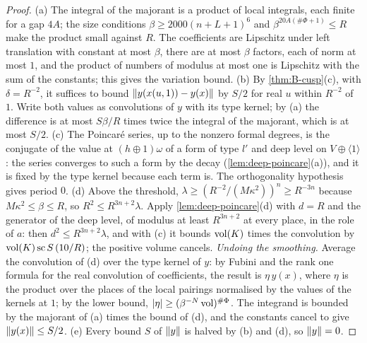 \begin{proof}
(a) The integral of the majorant is a product of local integrals, each finite for a gap $4A$; the size conditions $\beta\ge2000(n+L+1)^6$ and $\beta^{20A(\#\Phi+1)}\le R$ make the product small against $R$. The coefficients are
Lipschitz under left translation with constant at most $\beta$, there are at most $\beta$ factors, each of norm at most $1$, and the product of numbers of modulus at most one is Lipschitz with the sum of the constants;
this gives the variation bound. (b) By \cref{thm:B-cusp}(c), with $\delta=R^{-2}$, it suffices to bound $\lVert y(x(u,1))-y(x)\rVert$ by $S/2$ for real $u$ within $R^{-2}$ of $1$. Write both values as convolutions of $y$ with its type
kernel; by (a) the difference is at most $S\beta/R$ times twice the integral of the majorant, which is at most $S/2$. (c) The Poincar\'e series, up to the nonzero formal degrees, is the conjugate of the value at
$(h\oplus1)\omega$ of a form of type $l'$ and deep level on $V\oplus\langle1\rangle$: the series converges to such a form by the decay (\cref{lem:deep-poincare}(a)), and it is fixed by the type kernel because each term is.
The orthogonality hypothesis gives period $0$. (d) Above the threshold, $\lambda\ge(R^{-2}/(M\kappa^2))^n\ge R^{-3n}$ because $M\kappa^2\le\beta\le R$, so $R^2\le R^{3n+2}\lambda$. Apply \cref{lem:deep-poincare}(d) with $d=R$ and
the generator of the deep level, of modulus at least $R^{3n+2}$ at every place, in the role of $a$: then $d^2\le R^{3n+2}\lambda$, and with (c) it bounds $\operatorname{vol}(K)$ times the convolution by $\operatorname{vol}(K)\,\mathrm{sc}\,S\,(10/R)$; the positive volume cancels. \emph{Undoing the smoothing.} Average the convolution of (d) over the type kernel of
$y$: by Fubini and the rank one formula for the real convolution of coefficients, the result is $\eta\,y(x)$, where $\eta$ is the product over the places of the local pairings normalised by the values of the kernels at
$1$; by the lower bound, $\lvert \eta\rvert\ge(\beta^{-N}\operatorname{vol})^{\#\Phi}$. The integrand is bounded by the majorant of (a) times the bound of (d), and the constants cancel to give $\lVert y(x)\rVert\le S/2$. (e) Every bound $S$ of $\lVert y\rVert$ is
halved by (b) and (d), so $\lVert y\rVert=0$.
\end{proof}

